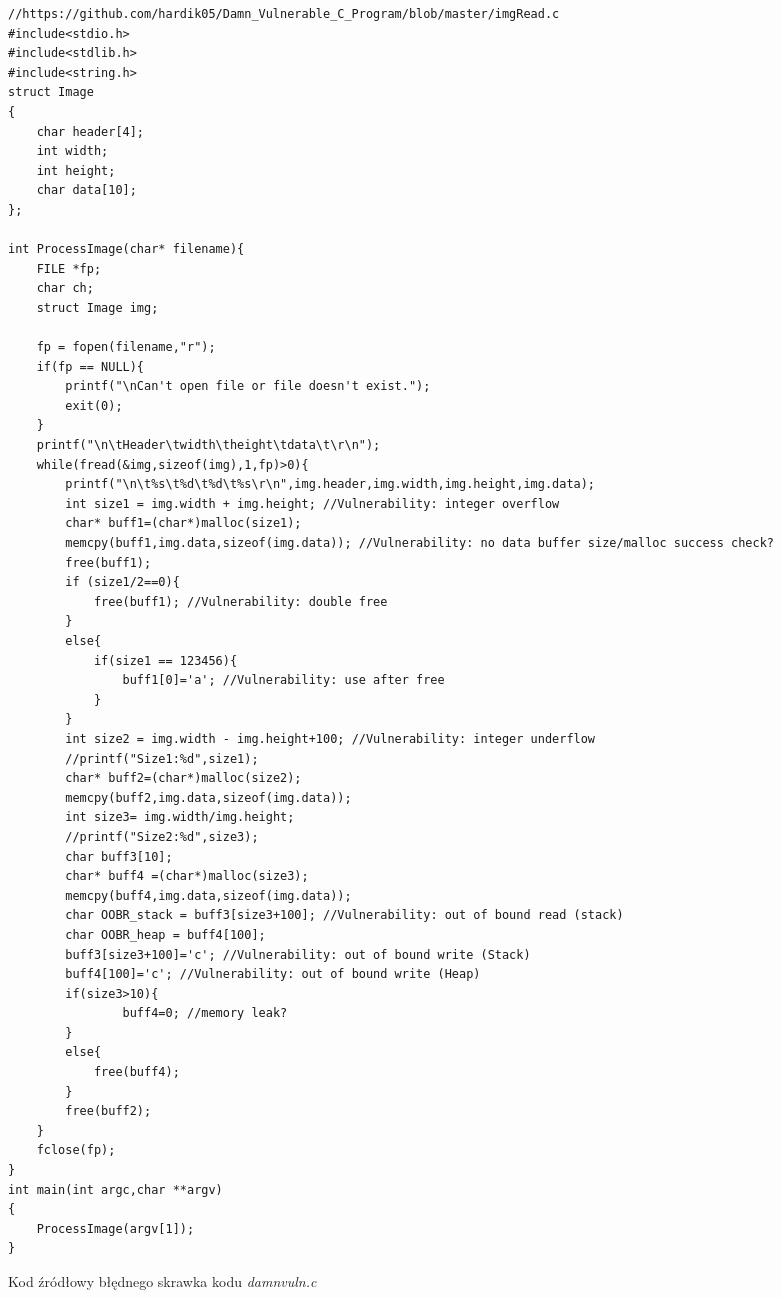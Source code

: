 \begin{listing}
  \begin{verbatim}
//https://github.com/hardik05/Damn_Vulnerable_C_Program/blob/master/imgRead.c
#include<stdio.h>
#include<stdlib.h>
#include<string.h>
struct Image
{
	char header[4];
	int width;
	int height;
	char data[10];
};

int ProcessImage(char* filename){
	FILE *fp;
	char ch;
	struct Image img;

	fp = fopen(filename,"r"); 
	if(fp == NULL){
		printf("\nCan't open file or file doesn't exist.");
		exit(0);
	}
	printf("\n\tHeader\twidth\theight\tdata\t\r\n");
	while(fread(&img,sizeof(img),1,fp)>0){
		printf("\n\t%s\t%d\t%d\t%s\r\n",img.header,img.width,img.height,img.data);
		int size1 = img.width + img.height; //Vulnerability: integer overflow
		char* buff1=(char*)malloc(size1);
		memcpy(buff1,img.data,sizeof(img.data)); //Vulnerability: no data buffer size/malloc success check?
		free(buff1);
		if (size1/2==0){
			free(buff1); //Vulnerability: double free
		}
		else{
			if(size1 == 123456){
				buff1[0]='a'; //Vulnerability: use after free
			}
		}
		int size2 = img.width - img.height+100; //Vulnerability: integer underflow
		//printf("Size1:%d",size1);
		char* buff2=(char*)malloc(size2);
		memcpy(buff2,img.data,sizeof(img.data));
		int size3= img.width/img.height;
		//printf("Size2:%d",size3);
		char buff3[10];
		char* buff4 =(char*)malloc(size3);
		memcpy(buff4,img.data,sizeof(img.data));
		char OOBR_stack = buff3[size3+100]; //Vulnerability: out of bound read (stack)
		char OOBR_heap = buff4[100];
		buff3[size3+100]='c'; //Vulnerability: out of bound write (Stack)
		buff4[100]='c'; //Vulnerability: out of bound write (Heap)
		if(size3>10){
				buff4=0; //memory leak?
		}
		else{
			free(buff4);
		}
		free(buff2);
	}
	fclose(fp);
}
int main(int argc,char **argv)
{
	ProcessImage(argv[1]);
}
\end{verbatim}
\caption{Kod źródłowy błędnego skrawka kodu \textit{damnvuln.c}}
\label{lst:code1}
\end{listing}
\restoregeometry

